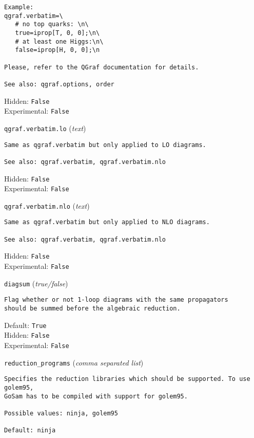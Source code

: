 \begin{basedescript}{\desclabelstyle{\pushlabel}}
\begin{verbatim}
Example:
qgraf.verbatim=\
   # no top quarks: \n\
   true=iprop[T, 0, 0];\n\
   # at least one Higgs:\n\
   false=iprop[H, 0, 0];\n

Please, refer to the QGraf documentation for details.

See also: qgraf.options, order
\end{verbatim}
Hidden: \verb|False|
\\Experimental: \verb|False|
\\\item[\colorbox{gray!30}{\texttt{qgraf.verbatim.lo}}] (\textit{text})
\begin{verbatim}
Same as qgraf.verbatim but only applied to LO diagrams.

See also: qgraf.verbatim, qgraf.verbatim.nlo
\end{verbatim}
Hidden: \verb|False|
\\Experimental: \verb|False|
\\\item[\colorbox{gray!30}{\texttt{qgraf.verbatim.nlo}}] (\textit{text})
\begin{verbatim}
Same as qgraf.verbatim but only applied to NLO diagrams.

See also: qgraf.verbatim, qgraf.verbatim.nlo
\end{verbatim}
Hidden: \verb|False|
\\Experimental: \verb|False|
\\\item[\colorbox{gray!30}{\texttt{diagsum}}] (\textit{true/false})
\begin{verbatim}
Flag whether or not 1-loop diagrams with the same propagators
should be summed before the algebraic reduction.
\end{verbatim}
Default: \verb|True|
\\Hidden: \verb|False|
\\Experimental: \verb|False|
\\\item[\colorbox{gray!30}{\texttt{reduction\_programs}}] (\textit{comma separated list})
\begin{verbatim}
Specifies the reduction libraries which should be supported. To use golem95,
GoSam has to be compiled with support for golem95.

Possible values: ninja, golem95

Default: ninja


\end{verbatim}
\end{basedescript}
